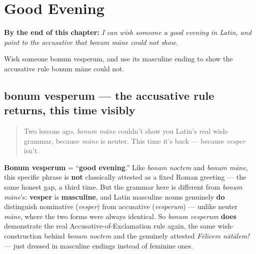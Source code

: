 
\chapter{Good Evening}
\label{ch:la-good-evening}

\begin{chapteropening}
\textbf{By the end of this chapter:} \emph{I can wish someone a good evening in Latin, and point to the accusative that bonum māne could not show.}

Wish someone bonum vesperum, and use its masculine ending to show the accusative rule bonum māne could not.
\end{chapteropening}

\section[bonum vesperum]{bonum vesperum — the accusative rule returns, this time visibly}

\label{lesson:LA-C34-bonum-vesperum}



\begin{quote}
Two lessons ago, \emph{bonum māne} couldn't show you Latin's real wish-grammar, because \emph{māne} is neuter. This time it's back — because \emph{vesper} isn't.
\end{quote}

\begin{grammarlens}[title={Grammar Lens: bonum vesperum — masculine, and the case shows again}]
\textbf{Bonum vesperum} = \textquotedblleft{}\textbf{good evening}.\textquotedblright{} Like \emph{bonam noctem} and \emph{bonum māne}, this specific phrase is \textbf{not} classically attested as a fixed Roman greeting — the same honest gap, a third time. But the grammar here is different from \emph{bonum māne}'s: \textbf{vesper} is \textbf{masculine}, and Latin masculine nouns genuinely \textbf{do} distinguish nominative (\emph{vesper}) from accusative (\emph{vesperum}) — unlike neuter \emph{māne}, where the two forms were always identical. So \emph{bonum vesperum} \textbf{does} demonstrate the real Accusative-of-Exclamation rule again, the same wish-construction behind \emph{bonam noctem} and the genuinely attested \emph{Fēlīcem nātālem!} — just dressed in masculine endings instead of feminine ones.
\end{grammarlens}

